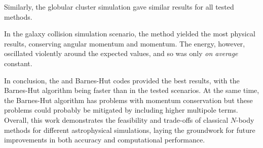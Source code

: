 Similarly, the globular cluster simulation gave similar results for all tested methods.

In the galaxy collision simulation scenario, the \PThreeM{} method yielded the most physical results, conserving angular momentum and momentum.
The energy, however, oscillated violently around the expected values, and so was only \textit{on average} constant.

In conclusion, the \PThreeM{} and Barnes-Hut codes provided the best results, with the Barnes-Hut algorithm being faster than \PThreeM{} in the tested scenarios.
At the same time, the Barnes-Hut algorithm has problems with momentum conservation but these problems could probably be mitigated by including higher multipole terms.
Overall, this work demonstrates the feasibility and trade-offs of classical $N$-body methods for different astrophysical simulations, laying the groundwork for future improvements in both accuracy and computational performance.
